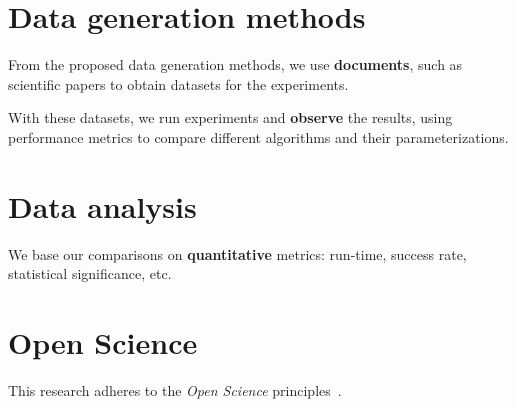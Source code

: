 


\section{Data generation methods}
From the proposed data generation methods, we use \textbf{documents},
such as scientific papers to obtain datasets for the experiments.

With these datasets, we run experiments and \textbf{observe} the results,
using performance metrics to compare different algorithms and their parameterizations.

\section{Data analysis}
We base our comparisons on \textbf{quantitative} metrics: run-time, success rate,
statistical significance, etc.

\section{Open Science}
This research adheres to the \emph{Open Science} principles~\cite{oro44719}.

